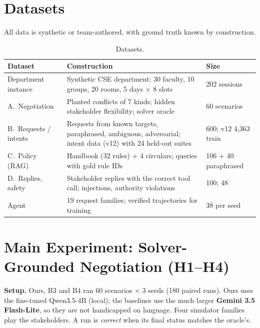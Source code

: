 \documentclass[11pt,a4paper]{article}
\begin{document}
\section{Datasets}
All data is synthetic or team-authored, with ground truth known by construction.
\begin{table}[H]
\centering\small
\begin{tabularx}{\textwidth}{@{}L{3.4cm} Y L{3.0cm}@{}}
\toprule
\textbf{Dataset} & \textbf{Construction} & \textbf{Size}\\
\midrule
Department instance & Synthetic CSE department: 30 faculty, 10 groups, 20 rooms, 5 days $\times$ 8 slots & 202 sessions\\
A.\ Negotiation & Planted conflicts of 7 kinds; hidden stakeholder flexibility; solver oracle & 60 scenarios\\
B.\ Requests / intents & Requests from known targets, paraphrased, ambiguous, adversarial; intent data (v12) with 24 held-out suites & 600; v12 4{,}363 train\\
C.\ Policy (RAG) & Handbook (32 rules) + 4 circulars; queries with gold rule IDs & 106 + 40 paraphrased\\
D.\ Replies, safety & Stakeholder replies with the correct tool call; injections, authority violations & 100; 48\\
Agent & 19 request families; verified trajectories for training & 38 per seed\\
\bottomrule
\end{tabularx}
\caption{Datasets.}
\end{table}

\section{Main Experiment: Solver-Grounded Negotiation (H1--H4)}
\textbf{Setup.} Ours, B3 and B4 ran 60 scenarios $\times$ 3 seeds (180 paired runs).
Ours uses the fine-tuned Qwen3.5-4B (local); the baselines use the much larger
\textbf{Gemini 3.5 Flash-Lite}, so they are not handicapped on language. Four simulator
families play the stakeholders. A run is \emph{correct} when its final status matches
the oracle's.
\end{document}
